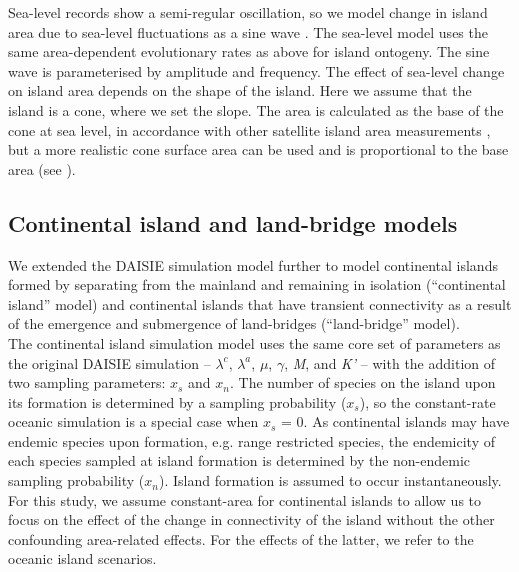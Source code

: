 \documentclass{article}
\begin{document}
Sea-level records show a semi-regular oscillation, so we model change in island area due to sea-level fluctuations as a sine wave \citep{miller_phanerozoic_2005, bintanja_modelled_2005}. The sea-level model uses the same area-dependent evolutionary rates as above for island ontogeny. The sine wave is parameterised by amplitude and frequency. The effect of sea-level change on island area depends on the shape of the island. Here we assume that the island is a cone, where we set the slope. The area is calculated as the base of the cone at sea level, in accordance with other satellite island area measurements \citep{lim_true_2017, valente_simple_2020}, but a more realistic cone surface area can be used and is proportional to the base area (see ). \\

\subsection*{Continental island and land-bridge models}

We extended the DAISIE simulation model further to model continental islands formed by separating from the mainland and remaining in isolation (“continental island” model) and continental islands that have transient connectivity as a result of the emergence and submergence of land-bridges (“land-bridge” model). \\

The continental island simulation model uses the same core set of parameters as the original DAISIE simulation -- $\lambda^c$, $\lambda^a$, $\mu$, $\gamma$, \textit{M}, and \textit{K’} -- with the addition of two sampling parameters: $x_s$ and $x_n$. The number of species on the island upon its formation is determined by a sampling probability ($x_s$), so the constant-rate oceanic simulation is a special case when $x_s$ = 0. As continental islands may have endemic species upon formation, e.g. range restricted species, the endemicity of each species sampled at island formation is determined by the non-endemic sampling probability ($x_n$). Island formation is assumed to occur instantaneously. For this study, we assume constant-area for continental islands to allow us to focus on the effect of the change in connectivity of the island without the other confounding area-related effects. For the effects of the latter, we refer to the oceanic island scenarios. \\
\end{document}

